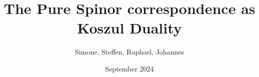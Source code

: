 \documentclass[11pt]{article}
\begin{document}
\title{The Pure Spinor correspondence as Koszul Duality}

\pubnum{
}

\author{Simone, Steffen, Raphael, Johannes}

\date{September 2024}

\maketitle







\printbibliography[heading=bibintoc]
\end{document}
